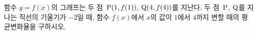 함수 $y=f(x)$의 그래프는 두 점~$\mathrm{P}(1{,}\mkern3mu\mathopen{}f(1))$, $\mathrm{Q}(4{,}\mkern3mu\mathopen{}f(4))$를 지난다. 두 점~$\mathrm{P}$, $\mathrm{Q}$를 지나는 직선의 기울기가 $-2$일 때, 함수 $f(x)$에서 $x$의 값이 $1$에서 $4$까지 변할 때의 평균변화율을 구하시오.
